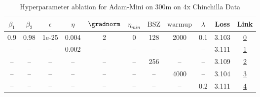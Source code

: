 \begin{table}[H]
\centering
\caption{Hyperparameter ablation for Adam-Mini on 300m on 4x Chinchilla Data}
\label{tab:ablation_adam-mini_300m_on_4x_chinchilla_data}
\begin{tabular}{ccccccccccc}
\toprule
$\beta_1$ & $\beta_2$ & $\epsilon$ & $\eta$ & $\gradnorm$ & $\eta_{min}$ & $\mathrm{BSZ}$ & $\mathrm{warmup}$ & $\lambda$ & Loss & Link \\
\midrule
0.9 & 0.98 & 1e-25 & 0.004 & 2 & 0 & 128 & 2000 & 0.1 & 3.103 & \href{https://wandb.ai/stanford-mercury/optimizer-scaling/runs/sweep-300m-24B-mini09d394lr0.004-wd0.1-minlr0-warmup2000-b10.9-b-4e8de7}{0} \\
\midrule
-- & -- & -- & 0.002 & -- & -- & -- & -- & -- & 3.111 & \href{https://wandb.ai/stanford-mercury/optimizer-scaling/runs/sweep-300m-24B-mini5d38a2lr0.002-wd0.1-minlr0-warmup2000-b10.9-b-951b01}{1} \\
-- & -- & -- & -- & -- & -- & 256 & -- & -- & 3.109 & \href{https://wandb.ai/stanford-mercury/optimizer-scaling/runs/sweep-300m-24B-minid571a7lr0.004-wd0.1-minlr0-warmup2000-b10.9-b-e475d2}{2} \\
-- & -- & -- & -- & -- & -- & -- & 4000 & -- & 3.104 & \href{https://wandb.ai/stanford-mercury/optimizer-scaling/runs/sweep-300m-24B-mini0831d8lr0.004-wd0.1-minlr0-warmup4000-b10.9-b-41a654}{3} \\
-- & -- & -- & -- & -- & -- & -- & -- & 0.2 & 3.111 & \href{https://wandb.ai/stanford-mercury/optimizer-scaling/runs/sweep-300m-24B-mini891741lr0.004-wd0.2-minlr0-warmup2000-b10.9-b-a97787}{4} \\
\bottomrule
\end{tabular}
\end{table}

